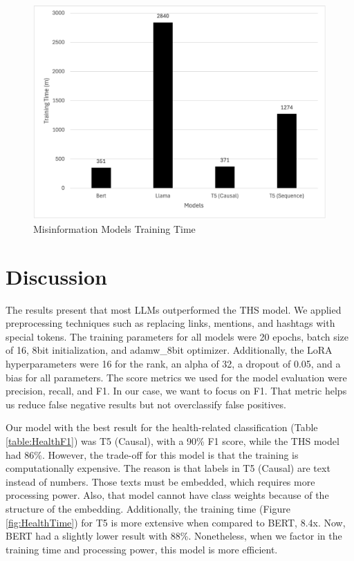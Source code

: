 \begin{figure}[H]
	\begin{center}
		\includegraphics[width=1\textwidth]{images/Misinformation_training_time.png} %
	\end{center}
	\caption{Misinformation Models Training Time} %
	\label{fig:MisinformationTime}
\end{figure}



\section{Discussion}

The results present that most LLMs outperformed the THS model. We applied preprocessing techniques such as replacing links, mentions, and hashtags with special tokens. The training
parameters for all models were 20 epochs, batch size of 16, 8bit initialization, and adamw\_8bit optimizer. Additionally, the LoRA hyperparameters were 16 for the rank, an alpha of 32, a dropout
of 0.05, and a bias for all parameters. The score metrics we used for the model evaluation were precision, recall, and F1. In our case, we want to focus on F1. That metric helps us reduce false
negative results but not overclassify false positives.

Our model with the best result for the health-related classification (Table \ref{table:HealthF1}) was T5 (Causal), with a 90\% F1 score, while the THS model had 86\%. However, the trade-off
for this model is that the training is computationally expensive. The reason is that labels in T5 (Causal) are text instead of numbers. Those texts must be embedded, which requires more
processing power. Also, that model cannot have class weights because of the structure of the embedding. Additionally, the training time  (Figure \ref{fig:HealthTime}) for T5 is more extensive
when compared to BERT, 8.4x. Now, BERT had a slightly lower result with 88\%. Nonetheless, when we factor in the training time and processing power, this model is more efficient.

